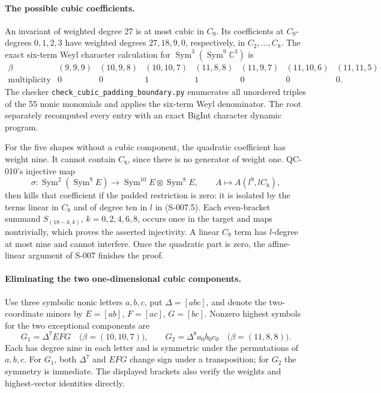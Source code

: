 \paragraph{The possible cubic coefficients.}
An invariant of weighted degree 27 is at most cubic in $C_9$.
Its coefficients at $C_9$-degrees $0,1,2,3$ have weighted degrees
$27,18,9,0$, respectively, in $C_2,\ldots,C_8$.
The exact six-term Weyl character calculation for
$\operatorname{Sym}^3(\operatorname{Sym}^9\mathbb C^3)$ is
\[
\begin{array}{c|rrrrrrr}
\beta&(9,9,9)&(10,9,8)&(10,10,7)&(11,8,8)&(11,9,7)&(11,10,6)&(11,11,5)\\
\hline
\text{multiplicity}&0&0&1&1&0&0&0.
\end{array}                                                   \tag{S-008.2}
\]
The checker \texttt{check\_cubic\_padding\_boundary.py} enumerates
all unordered triples of the 55 nonic monomials and applies the
six-term Weyl denominator.  The root separately recomputed every
entry with an exact BigInt character dynamic program.

For the five shapes without a cubic component, the quadratic
coefficient has weight nine.  It cannot contain $C_8$, since there
is no generator of weight one.  QC-010's injective map
\[
 \sigma:\operatorname{Sym}^2(\operatorname{Sym}^9E)
       \longrightarrow\operatorname{Sym}^{10}E\otimes\operatorname{Sym}^8E,
 \qquad A\longmapsto A(l^9,lC_8),                              \tag{S-008.3}
\]
then kills that coefficient if the padded restriction is zero:
it is isolated by the terms linear in $C_8$ and of degree ten in
$l$ in (S-007.5).  Each even-bracket summand
$S_{(18-k,k)}$, $k=0,2,4,6,8$, occurs once in the target and maps
nontrivially, which proves the asserted injectivity.  A linear
$C_9$ term has $l$-degree at most nine and cannot interfere.
Once the quadratic part is zero, the affine-linear argument of
S-007 finishes the proof.

\paragraph{Eliminating the two one-dimensional cubic components.}
Use three symbolic nonic letters $a,b,c$, put
$\Delta=[abc]$, and denote the two-coordinate minors by
$E=[ab]$, $F=[ac]$, $G=[bc]$.  Nonzero highest symbols for the
two exceptional components are
\[
 G_1=\Delta^7EFG\quad\bigl(\beta=(10,10,7)\bigr),\qquad
 G_2=\Delta^8a_0b_0c_0\quad\bigl(\beta=(11,8,8)\bigr).       \tag{S-008.4}
\]
Each has degree nine in each letter and is symmetric under the
permutations of $a,b,c$.  For $G_1$, both $\Delta^7$ and $EFG$
change sign under a transposition; for $G_2$ the symmetry is immediate.
The displayed brackets also verify the weights and highest-vector
identities directly.

